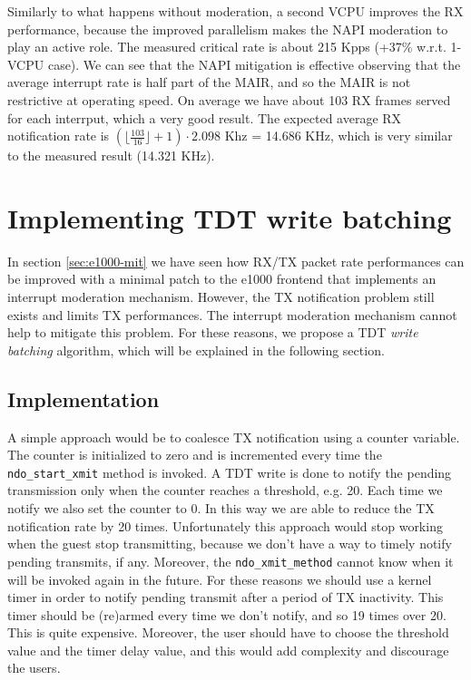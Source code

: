Similarly to what happens without moderation, a second VCPU improves the RX performance, because the improved parallelism makes the
NAPI moderation to play an active role.
The measured critical rate is about 215 Kpps (+37\% w.r.t. 1-VCPU case).
We can see that the NAPI mitigation is effective observing that the average interrupt rate is half part of the MAIR, and so the MAIR is not
restrictive at operating speed. On average we have about 103 RX frames served for each interrput, which a very good result.
The expected average RX notification rate is $(\lfloor \frac{103}{16} \rfloor + 1) \cdot 2.098$ Khz = 14.686 KHz, which is very similar to
the measured result (14.321 KHz).




\section{Implementing TDT write batching}
In section \ref{sec:e1000-mit} we have seen how RX/TX packet rate performances can be improved with a minimal patch to the
e1000 frontend that implements an interrupt moderation mechanism.
However, the TX notification problem still exists and limits TX performances. The interrupt moderation mechanism cannot help to mitigate
this problem. For these reasons, we propose a TDT \emph{write batching} algorithm, which will be explained in the following section.


\subsection{Implementation}
A simple approach would be to coalesce TX notification using a counter variable. The counter is initialized to zero and is incremented 
every time the \texttt{ndo\_start\_xmit} method is invoked. A TDT write is done to notify the pending transmission only when the counter 
reaches a threshold, e.g. 20. Each time we notify we also set the counter to 0.
In this way we are able to reduce the TX notification rate by 20 times.
Unfortunately this approach would stop working when the guest stop transmitting, because we don't have a way to timely notify pending 
transmits, if any. Moreover, the \texttt{ndo\_xmit\_method} cannot know when it will be invoked again in the future. 
For these reasons we should use a kernel timer in order to notify pending transmit after a period of TX inactivity. This timer should be
(re)armed every time we don't notify, and so 19 times over 20. This is quite expensive.
Moreover, the user should have to choose the threshold value and the timer delay value, and this would add complexity and discourage the
users.

